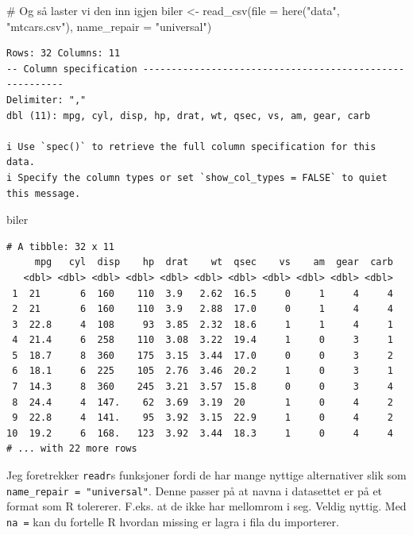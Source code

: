 \documentclass[
  letterpaper,
  DIV=11,
  numbers=noendperiod]{scrreprt}
\newenvironment{Shaded}{\begin{snugshade}}{\end{snugshade}}
\newcommand{\AttributeTok}[1]{\textcolor[rgb]{0.40,0.45,0.13}{#1}}
\newcommand{\CommentTok}[1]{\textcolor[rgb]{0.37,0.37,0.37}{#1}}
\newcommand{\FunctionTok}[1]{\textcolor[rgb]{0.28,0.35,0.67}{#1}}
\newcommand{\NormalTok}[1]{\textcolor[rgb]{0.00,0.23,0.31}{#1}}
\newcommand{\OtherTok}[1]{\textcolor[rgb]{0.00,0.23,0.31}{#1}}
\newcommand{\StringTok}[1]{\textcolor[rgb]{0.13,0.47,0.30}{#1}}
\begin{document}
\begin{Shaded}
\begin{Highlighting}[]
\CommentTok{\# Og så laster vi den inn igjen}
\NormalTok{biler }\OtherTok{\textless{}{-}} \FunctionTok{read\_csv}\NormalTok{(}\AttributeTok{file =} \FunctionTok{here}\NormalTok{(}\StringTok{"data"}\NormalTok{, }\StringTok{"mtcars.csv"}\NormalTok{), }\AttributeTok{name\_repair =} \StringTok{"universal"}\NormalTok{)}
\end{Highlighting}
\end{Shaded}

\begin{verbatim}
Rows: 32 Columns: 11
-- Column specification --------------------------------------------------------
Delimiter: ","
dbl (11): mpg, cyl, disp, hp, drat, wt, qsec, vs, am, gear, carb

i Use `spec()` to retrieve the full column specification for this data.
i Specify the column types or set `show_col_types = FALSE` to quiet this message.
\end{verbatim}

\begin{Shaded}
\begin{Highlighting}[]
\NormalTok{biler}
\end{Highlighting}
\end{Shaded}

\begin{verbatim}
# A tibble: 32 x 11
     mpg   cyl  disp    hp  drat    wt  qsec    vs    am  gear  carb
   <dbl> <dbl> <dbl> <dbl> <dbl> <dbl> <dbl> <dbl> <dbl> <dbl> <dbl>
 1  21       6  160    110  3.9   2.62  16.5     0     1     4     4
 2  21       6  160    110  3.9   2.88  17.0     0     1     4     4
 3  22.8     4  108     93  3.85  2.32  18.6     1     1     4     1
 4  21.4     6  258    110  3.08  3.22  19.4     1     0     3     1
 5  18.7     8  360    175  3.15  3.44  17.0     0     0     3     2
 6  18.1     6  225    105  2.76  3.46  20.2     1     0     3     1
 7  14.3     8  360    245  3.21  3.57  15.8     0     0     3     4
 8  24.4     4  147.    62  3.69  3.19  20       1     0     4     2
 9  22.8     4  141.    95  3.92  3.15  22.9     1     0     4     2
10  19.2     6  168.   123  3.92  3.44  18.3     1     0     4     4
# ... with 22 more rows
\end{verbatim}

Jeg foretrekker \texttt{readr}s funksjoner fordi de har mange nyttige
alternativer slik som \texttt{name\_repair\ =\ "universal"}. Denne
passer på at navna i datasettet er på et format som R tolererer. F.eks.
at de ikke har mellomrom i seg. Veldig nyttig. Med \texttt{na\ =} kan du
fortelle R hvordan missing er lagra i fila du importerer.
\end{document}
